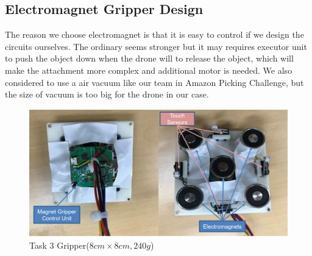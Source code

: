 \documentclass{standalone}
\begin{document}
\subsection{Electromagnet Gripper Design}
The reason we choose electromagnet is that it is easy to control if we design the circuits ourselves. The ordinary seems stronger but it may requires executor unit to push the object down when the drone will to release the object, which will make the attachment more complex and additional motor is needed. We also considered to use a air vacuum like our team in Amazon Picking Challenge, but the size of vacuum is too big for the drone in our case. 
 \begin{figure}[hb]
    \begin{center}
    \includegraphics[keepaspectratio=true, width=1\linewidth, height=0.3\textheight]
    {sections//task3//images//task3gripper.png}
      \end{center}
    \caption{Task 3 Gripper($8cm \times 8cm, 240g$)}
    \label{task3platform}
    \end{figure}
\end{document}
